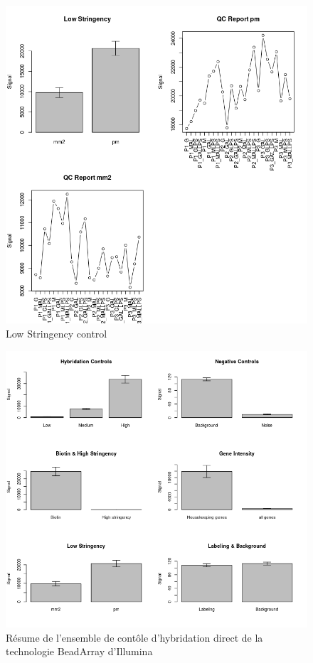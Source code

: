 \documentclass[a4paper,10pt]{article}
\begin{document}
\begin{figure}
 \centering
 \includegraphics[scale=0.5]{../../R/output/LowStringency.png}
 \caption{Low Stringency control}
 \label{fig:lowStringency}
\end{figure}
\begin{figure}
 \centering
 \includegraphics[scale=0.5]{../../R/output/SummaryControl.png}
 \caption{Résume de l'ensemble de contôle d'hybridation direct de la technologie BeadArray d'Illumina}
 \label{fig:summaryControl}
\end{figure}
\end{document}
